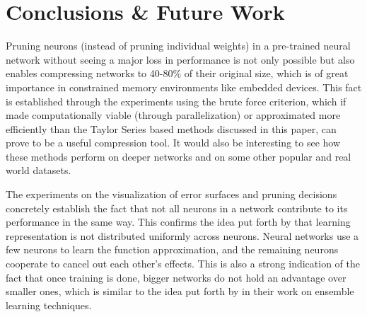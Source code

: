 \section{Conclusions \& Future Work}
Pruning neurons (instead of pruning individual weights) in a pre-trained neural network without seeing a major loss in performance is not only possible but also enables compressing networks to 40-80\% of their original size, which is of great importance in constrained memory environments like embedded devices. This fact is established through the experiments using the brute force criterion, which if made computationally viable (through parallelization) or approximated more efficiently than the Taylor Series based methods discussed in this paper, can prove to be a useful compression tool. It would also be interesting to see how these methods perform on deeper networks and on some other popular and real world datasets.

The experiments on the visualization of error surfaces and pruning decisions concretely establish the fact that not all neurons in a network contribute to its performance in the same way. This confirms the idea put forth by \cite{mozer1989using} that learning representation is not distributed uniformly across neurons. Neural networks use a few neurons to learn the function approximation, and the remaining neurons cooperate to cancel out each other's effects. This is also a strong indication of the fact that once training is done, bigger networks do not hold an advantage over smaller ones, which is similar to the idea put forth by \cite{darkknowledge2015} in their work on ensemble learning techniques.

